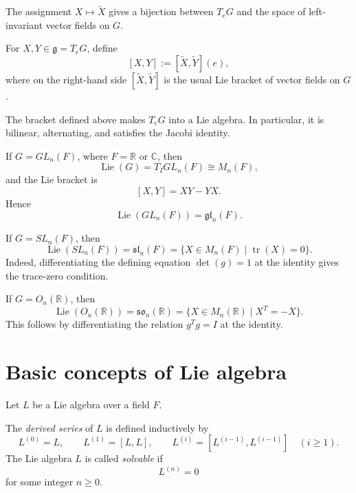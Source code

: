 \documentclass[11pt, a4paper]{report}
\begin{document}
    \begin{proposition}
    The assignment \(X\mapsto \widetilde X\) gives a bijection between \(T_eG\) and the space of left-invariant vector fields on \(G\).
    \end{proposition}
    
    \begin{definition}
    For \(X,Y\in \mathfrak g=T_eG\), define
    \[
    [X,Y]:=[\widetilde X,\widetilde Y](e),
    \]
    where on the right-hand side \([\widetilde X,\widetilde Y]\) is the usual Lie bracket of vector fields on \(G\).
    \end{definition}
    
    \begin{proposition}
    The bracket defined above makes \(T_eG\) into a Lie algebra. In particular, it is bilinear, alternating, and satisfies the Jacobi identity.
    \end{proposition}
    
    \begin{example}
    If \(G=GL_n(F)\), where \(F=\mathbb R\) or \(\mathbb C\), then
    \[
    \operatorname{Lie}(G)=T_IGL_n(F)\cong M_n(F),
    \]
    and the Lie bracket is
    \[
    [X,Y]=XY-YX.
    \]
    Hence
    \[
    \operatorname{Lie}(GL_n(F))=\mathfrak{gl}_n(F).
    \]
    \end{example}
    
    \begin{example}
    If \(G=SL_n(F)\), then
    \[
    \operatorname{Lie}(SL_n(F))=\mathfrak{sl}_n(F)
    =\{X\in M_n(F)\mid \operatorname{tr}(X)=0\}.
    \]
    Indeed, differentiating the defining equation \(\det(g)=1\) at the identity gives the trace-zero condition.
    \end{example}
    
    \begin{example}
    If \(G=O_n(\mathbb R)\), then
    \[
    \operatorname{Lie}(O_n(\mathbb R))=\mathfrak{so}_n(\mathbb R)
    =\{X\in M_n(\mathbb R)\mid X^T=-X\}.
    \]
    This follows by differentiating the relation \(g^Tg=I\) at the identity.
    \end{example}

\section{Basic concepts of Lie algebra}

Let \(L\) be a Lie algebra over a field \(F\).

\begin{definition}
The \emph{derived series} of \(L\) is defined inductively by
\[
L^{(0)}=L, \qquad L^{(1)}=[L,L], \qquad L^{(i)}=[L^{(i-1)},L^{(i-1)}]\quad (i\ge 1).
\]
The Lie algebra \(L\) is called \emph{solvable} if
\[
L^{(n)}=0
\]
for some integer \(n\ge 0\).
\end{definition}
\end{document}

